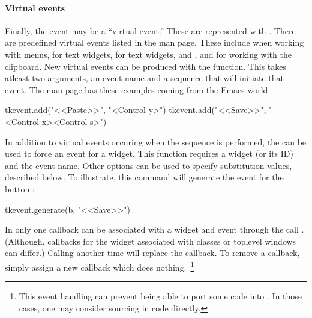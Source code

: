 \paragraph{Virtual events}
Finally, the event may be a ``virtual event.'' These are represented
with . There are predefined virtual
events listed in the  man page. These include
 when working with menus,
 for text widgets,
 for text widgets, and
,  and
 for working with the clipboard. New
virtual events can be produced with the 
function. This takes atleast two arguments, an event name and a
sequence that will initiate that event. The  man page has
these examples coming from the Emacs world:
\begin{Schunk}
\begin{Sinput}
  tkevent.add("<<Paste>>", "<Control-y>")
  tkevent.add("<<Save>>", "<Control-x><Control-s>")
\end{Sinput}
\end{Schunk}
In addition to virtual events occuring when the sequence is performed, the  can be used to force an event for a widget. This function requires a widget (or its ID) and the event name. Other options can be used to specify substitution values, described below. To illustrate, this command will generate the  event for the button :
\begin{Schunk}
\begin{Sinput}
 tkevent.generate(b, "<<Save>>")
\end{Sinput}
\end{Schunk}



In  only one callback can be associated with a widget and event through the call . (Although, callbacks for the widget associated with classes or toplevel windows can differ.) Calling  another time will replace the callback. To remove a callback, simply assign a new callback which does nothing.~\footnote{This event handling can prevent being able to port some \Tk\/ code into . In those cases, one may consider sourcing in \Tcl\/ code directly.}



